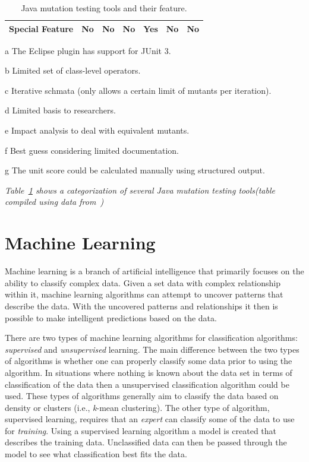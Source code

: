 \begin{landscape}
\begin{table}[h]
\begin{threeparttable}
\begin{tabular}{|l|l|l|l|l|l|l|}
        \hline \cellcolor[RGB]{169,196,223} \textbf{Special Feature} & No & No & No & Yes\tnote{e} & No & No \\
        \hline
      \end{tabular}
      \begin{tablenotes}
        \item[a] The Eclipse plugin has support for JUnit 3.
        \item[b] Limited set of class-level operators.
        \item[c] Iterative schmata (only allows a certain limit of mutants per iteration).
        \item[d] Limited basis to researchers.
        \item[e] Impact analysis to deal with equivalent mutants.
        \item[f] Best guess considering limited documentation.
        \item[g] The unit score could be calculated manually using structured output.
      \end{tablenotes}
    \end{threeparttable}
    \caption{Java mutation testing tools and their feature.}
    \vspace{1mm}
    \footnotesize{\emph{Table~\ref{tab:mutation_tools} shows a categorization of several Java mutation testing tools(table compiled using data from~\cite{PIT, MR10})}}
    \vspace{1mm}
    \label{tab:mutation_tools}
  \end{table}
\end{landscape}


\section{Machine Learning}
\label{sec:background_machine_learning}
Machine learning is a branch of artificial intelligence that primarily focuses on the ability to classify complex data. Given a set data with complex relationship within it, machine learning algorithms can attempt to uncover patterns that describe the data. With the uncovered patterns and relationships it then is possible to make intelligent predictions based on the data.

There are two types of machine learning algorithms for classification algorithms: \emph{supervised} and \emph{unsupervised} learning. The main difference between the two types of algorithms is whether one can properly classify some data prior to using the algorithm. In situations where nothing is known about the data set in terms of classification of the data then a unsupervised classification algorithm could be used. These types of algorithms generally aim to classify the data based on density or clusters (i.e., \emph{k}-mean clustering). The other type of algorithm, supervised learning, requires that an \emph{expert} can classify some of the data to use for \emph{training}. Using a supervised learning algorithm a model is created that describes the training data. Unclassified data can then be passed through the model to see what classification best fits the data.


